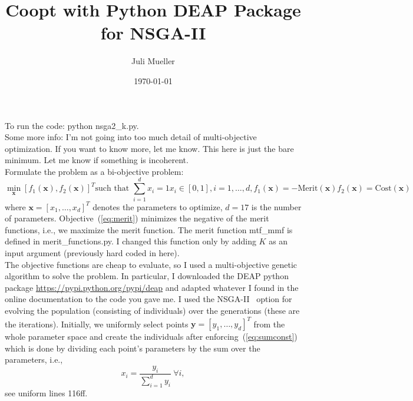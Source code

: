 \documentclass[review]{article}
\title{Coopt with Python DEAP Package for NSGA-II}
\author{\normalsize{Juli Mueller}}
\date{\normalsize{\today}}
\begin{document}
\maketitle

\noindent
To run the code: \textsf{python nsga2\_k.py}.\\



\noindent
Some more info:  I'm not going into too much detail of multi-objective optimization. If you want to know more, let me know. This here is just the bare minimum. Let me know if something is incoherent. \\
Formulate the problem as a bi-objective problem:
\begin{subequations}
\begin{equation}
\min_{\mathbf{x}}  [f_1(\mathbf{x}), f_2(\mathbf{x})]^T
\end{equation}
\begin{equation}
\text{such that } \sum_{i = 1}^d x_i = 1\label{eq:sumconst}
\end{equation}
\begin{equation}
x_i \in [0,1], i = 1, \ldots, d,
\end{equation}
\begin{equation}
f_1(\mathbf{x}) =  -\text{Merit}(\mathbf{x}) \label{eq:merit}
\end{equation}
\begin{equation}
f_2(\mathbf{x}) = \text{Cost}(\mathbf{x})
\end{equation}
\end{subequations}
where $\mathbf{x}=[x_1, \ldots, x_d]^T$ denotes the parameters to optimize,  $d=17$ is the number of parameters. Objective~(\ref{eq:merit}) minimizes the negative of the merit functions, i.e., we maximize the merit function. The merit function \textsf{mtf\_mmf} is defined in \textsf{merit\_functions.py}. I changed this function only by adding $K$ as an input argument (previously hard coded in here).\\

The objective functions are cheap to evaluate, so I used a multi-objective genetic algorithm to solve the problem. In particular, I downloaded the DEAP python package \url{https://pypi.python.org/pypi/deap} and adapted whatever I found in the online documentation to the code you gave me. I used the NSGA-II~\cite{Deb2000} option for evolving the population (consisting of individuals) over the generations (these are the iterations).  Initially, we uniformly select points $\mathbf{y}=[y_1, \ldots, y_d]^T$ from the whole parameter space and create the individuals after enforcing~(\ref{eq:sumconst}) which is done by dividing each point's parameters by the sum over the parameters, i.e., 
\begin{equation}
x_i = \frac{y_i}{\sum_{i=1}^d y_i} \ \forall i, \label{eq: forceone}
\end{equation}
see \textsf{uniform} lines 116ff.\\
\end{document}
